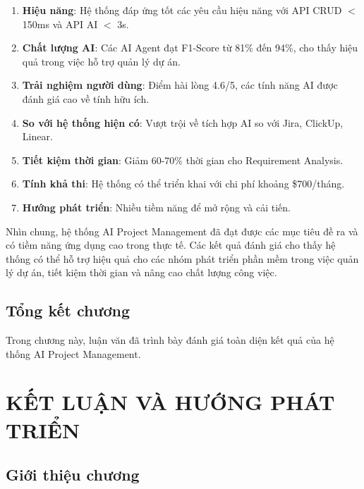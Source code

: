 \documentclass[12pt,a4paper]{report}
\begin{document}
\begin{enumerate}
\item \textbf{Hiệu năng}: Hệ thống đáp ứng tốt các yêu cầu hiệu năng với API CRUD $<$ 150ms và API AI $<$ 3s.

\item \textbf{Chất lượng AI}: Các AI Agent đạt F1-Score từ 81\% đến 94\%, cho thấy hiệu quả trong việc hỗ trợ quản lý dự án.

\item \textbf{Trải nghiệm người dùng}: Điểm hài lòng 4.6/5, các tính năng AI được đánh giá cao về tính hữu ích.

\item \textbf{So với hệ thống hiện có}: Vượt trội về tích hợp AI so với Jira, ClickUp, Linear.

\item \textbf{Tiết kiệm thời gian}: Giảm 60-70\% thời gian cho Requirement Analysis.

\item \textbf{Tính khả thi}: Hệ thống có thể triển khai với chi phí khoảng \$700/tháng.

\item \textbf{Hướng phát triển}: Nhiều tiềm năng để mở rộng và cải tiến.
\end{enumerate}

Nhìn chung, hệ thống AI Project Management đã đạt được các mục tiêu đề ra và có tiềm năng ứng dụng cao trong thực tế. Các kết quả đánh giá cho thấy hệ thống có thể hỗ trợ hiệu quả cho các nhóm phát triển phần mềm trong việc quản lý dự án, tiết kiệm thời gian và nâng cao chất lượng công việc.

\section{Tổng kết chương}


Trong chương này, luận văn đã trình bày đánh giá toàn diện kết quả của hệ thống AI Project Management.

\chapter{KẾT LUẬN VÀ HƯỚNG PHÁT TRIỂN}
\label{chap:conclusion}

\section{Giới thiệu chương}
\end{document}
